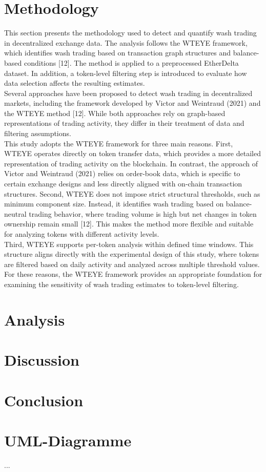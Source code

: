 \documentclass[language=english,thesis=bachelor,nosecondtitle,onesided,faculty=cb]{hsmw-thesis}
\begin{document}
		

	\chapter{Methodology}

This section presents the methodology used to detect and quantify wash trading in decentralized exchange data. The analysis follows the WTEYE framework, which identifies wash trading based on transaction graph structures and balance-based conditions [12]. The method is applied to a preprocessed EtherDelta dataset. In addition, a token-level filtering step is introduced to evaluate how data selection affects the resulting estimates.\\
Several approaches have been proposed to detect wash trading in decentralized markets, including the framework developed by Victor and Weintraud (2021) and the WTEYE method [12]. While both approaches rely on graph-based representations of trading activity, they differ in their treatment of data and filtering assumptions.\\
This study adopts the WTEYE framework for three main reasons. First, WTEYE operates directly on token transfer data, which provides a more detailed representation of trading activity on the blockchain. In contrast, the approach of Victor and Weintraud (2021) relies on order-book data, which is specific to certain exchange designs and less directly aligned with on-chain transaction structures.
Second, WTEYE does not impose strict structural thresholds, such as minimum component size. Instead, it identifies wash trading based on balance-neutral trading behavior, where trading volume is high but net changes in token ownership remain small [12]. This makes the method more flexible and suitable for analyzing tokens with different activity levels.\\
Third, WTEYE supports per-token analysis within defined time windows. This structure aligns directly with the experimental design of this study, where tokens are filtered based on daily activity and analyzed across multiple threshold values.\\
For these reasons, the WTEYE framework provides an appropriate foundation for examining the sensitivity of wash trading estimates to token-level filtering.\\

	\chapter{Analysis}
	\chapter{Discussion}
	\chapter{Conclusion}
	\appendix %
	

	\chapter{UML-Diagramme}
	...
\end{document}
